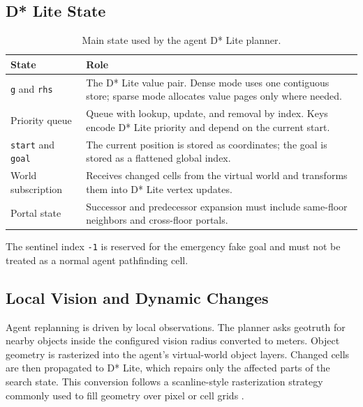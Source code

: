 \documentclass[12pt,a4paper]{report}
\begin{document}
\subsection{D* Lite State}

\begin{table}[H]
\centering
\begin{tabular}{|p{}|p{}|}
\hline
\textbf{State} & \textbf{Role} \\
\hline
\texttt{g} and \texttt{rhs} &
The D* Lite value pair. Dense mode uses one contiguous store; sparse mode
allocates value pages only where needed. \\
\hline
Priority queue &
Queue with lookup, update, and removal by index. Keys encode D* Lite priority
and depend on the current start. \\
\hline
\texttt{start} and \texttt{goal} &
The current position is stored as coordinates; the goal is stored as a flattened
global index. \\
\hline
World subscription &
Receives changed cells from the virtual world and transforms them into D* Lite
vertex updates. \\
\hline
Portal state &
Successor and predecessor expansion must include same-floor neighbors and
cross-floor portals. \\
\hline
\end{tabular}
\caption{Main state used by the agent D* Lite planner.}
\end{table}

The sentinel index \texttt{-1} is reserved for the emergency fake goal and must
not be treated as a normal agent pathfinding cell.

\subsection{Local Vision and Dynamic Changes}

Agent replanning is driven by local observations. The planner asks geotruth for
nearby objects inside the configured vision radius converted to meters. Object
geometry is rasterized into the agent's virtual-world object layers. Changed
cells are then propagated to D* Lite, which repairs only the affected parts of
the search state. This conversion follows a scanline-style rasterization
strategy commonly used to fill geometry over pixel or cell grids
\cite{foley1995computergraphics,pineda1988polygon}.
\end{document}
